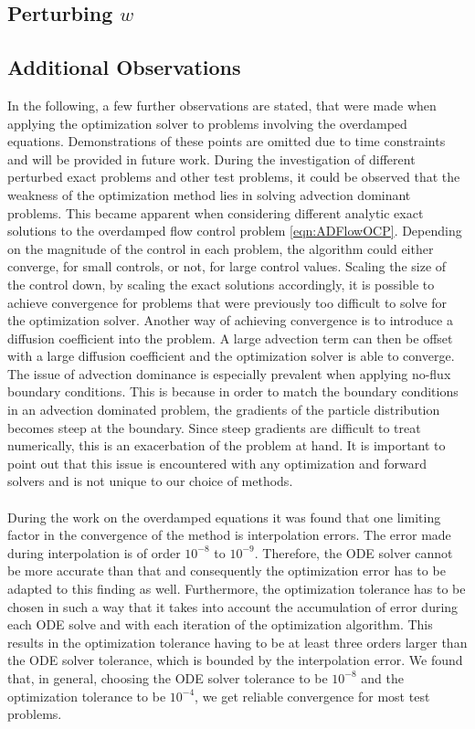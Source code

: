 \documentclass[11pt, a4paper]{article}
\theoremstyle{definition}
\begin{document}
\subsection{Perturbing $w$}

\subsection{Additional Observations}
In the following, a few further observations are stated, that were made when applying the optimization solver to problems involving the overdamped equations. Demonstrations of these points are omitted due to time constraints and will be provided in future work.
During the investigation of different perturbed exact problems and other test problems, it could be observed that the weakness of the optimization method lies in solving advection dominant problems. 
This became apparent when considering different analytic exact solutions to the overdamped flow control problem \eqref{eqn:ADFlowOCP}. Depending on the magnitude of the control in each problem, the algorithm could either converge, for small controls, or not, for large control values. Scaling the size of the control down, by scaling the exact solutions accordingly, it is possible to achieve convergence for problems that were previously too difficult to solve for the optimization solver. Another way of achieving convergence is to introduce a diffusion coefficient into the problem. A large advection term can then be offset with a large diffusion coefficient and the optimization solver is able to converge.
The issue of advection dominance is especially prevalent when applying no-flux boundary conditions. This is because in order to match the boundary conditions in an advection dominated problem, the gradients of the particle distribution becomes steep at the boundary. Since steep gradients are difficult to treat numerically, this is an exacerbation of the problem at hand.
It is important to point out that this issue is encountered with any optimization and forward solvers and is not unique to our choice of methods. 
\\
\\
During the work on the overdamped equations it was found that one limiting factor in the convergence of the method is interpolation errors. The error made during interpolation is of order $10^{-8}$ to $10^{-9}$. Therefore, the ODE solver cannot be more accurate than that and consequently the optimization error has to be adapted to this finding as well.
Furthermore, the optimization tolerance has to be chosen in such a way that it takes into account the accumulation of error during each ODE solve and with each iteration of the optimization algorithm. This results in the optimization tolerance having to be at least three orders larger than the ODE solver tolerance, which is bounded by the interpolation error. We found that, in general, choosing the ODE solver tolerance to be $10^{-8}$ and the optimization tolerance to be $10^{-4}$, we get reliable convergence for most test problems.
\end{document}
